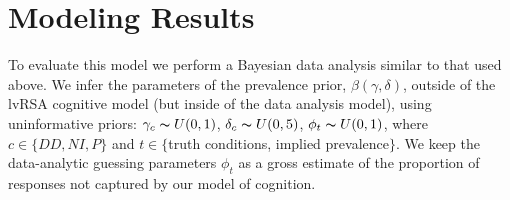 \documentclass[10pt,letterpaper]{article}
\begin{document}
\section{Modeling Results}

To evaluate this model we perform a Bayesian data analysis similar to that used above.
We infer the parameters of the prevalence prior, $\beta(\gamma,\delta)$, outside of the lvRSA cognitive model (but inside of the data analysis model), using uninformative priors:
$\gamma_{c} \thicksim U(0,1)$,  $\delta_{c} \thicksim U(0,5)$, $\phi_{t} \thicksim U(0,1)$,
where $c \in \{DD,NI,P\}$ and $t \in \{$truth conditions, implied prevalence$\}$.
We keep the data-analytic guessing parameters $\phi_{t}$ as a gross estimate of the proportion of responses not captured by our model of cognition. 
\end{document}

